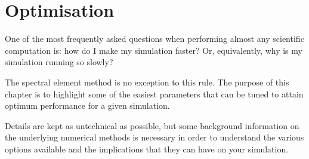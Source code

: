 \chapter{Optimisation}

One of the most frequently asked questions when performing almost any scientific
computation is: how do I make my simulation faster? Or, equivalently, why is my
simulation running so slowly?

The spectral element method is no exception to this rule. The purpose of this
chapter is to highlight some of the easiest parameters that can be tuned to
attain optimum performance for a given simulation.

Details are kept as untechnical as possible, but some background information on
the underlying numerical methods is necessary in order to understand the various
options available and the implications that they can have on your simulation.





